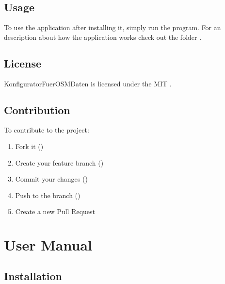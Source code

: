 \documentclass[letterpaper,10pt,english]{sphinxmanual}
\begin{document}
\section{Usage}
\label{\detokenize{index:usage}}
\sphinxAtStartPar
To use the application after installing it, simply run the program.
For an description about how the application works check out the folder
.


\section{License}
\label{\detokenize{index:license}}
\sphinxAtStartPar
KonfiguratorFuerOSMDaten is licensed under the MIT .


\section{Contribution}
\label{\detokenize{index:contribution}}
\sphinxAtStartPar
To contribute to the project:
\begin{enumerate}
%
\item {} 
\sphinxAtStartPar
Fork it ()

\item {} 
\sphinxAtStartPar
Create your feature branch ()

\item {} 
\sphinxAtStartPar
Commit your changes ()

\item {} 
\sphinxAtStartPar
Push to the branch ()

\item {} 
\sphinxAtStartPar
Create a new Pull Request

\end{enumerate}


\chapter{User Manual}
\label{\detokenize{index:user-manual}}
\sphinxstepscope


\section{Installation}
\label{\detokenize{installation:installation}}\label{\detokenize{installation::doc}}
\end{document}

